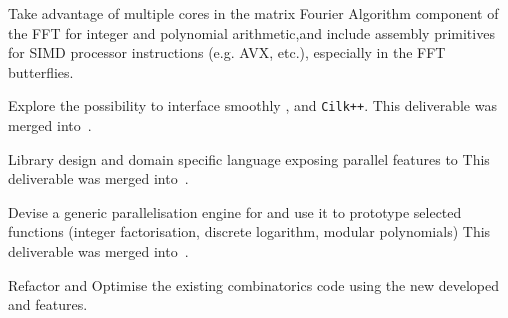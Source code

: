 \begin{workpackage}
\begin{wpdelivs}
\begin{wpdeliv}[due=18,miles=proto1,id=FFT,dissem=PU,nature=DEM, lead=UK,issue=120, status=delivered, blog=https://wbhart.blogspot.fr/2017/02/parallelising-integer-and-polynomial.html]
    {Take advantage of multiple cores in the matrix Fourier Algorithm component of the FFT for integer and polynomial arithmetic,and include assembly primitives for SIMD processor instructions (e.g. AVX, etc.), especially in the FFT butterflies.}
\end{wpdeliv}
  \begin{wpdeliv}[due=24,miles=proto1,id=cython-pythran-cilk,dissem=PU,nature=DEM,lead=PS,issue=121,status=canceled]
    {Explore the possibility to interface smoothly \Pythran, \Cython and \texttt{Cilk++}.}
    This deliverable was merged into~.
  \end{wpdeliv}
  \begin{wpdeliv}[due=24,miles=proto1,id=LinBox-DSL,dissem=PU,nature=R,lead=UJF,issue=122,status=canceled]
    {Library design and domain specific language exposing \Linbox parallel features to \Sage}
    This deliverable was merged into~.
  \end{wpdeliv}
  \begin{wpdeliv}[due=24,id=pari-hpc1,dissem=PU,nature=DEM,lead=UB,issue=108,status=canceled]
    {Devise a generic parallelisation engine for \Pari and use it to prototype selected functions
      (integer factorisation, discrete logarithm, modular polynomials)}
    This deliverable was merged into~.
  \end{wpdeliv}
  \begin{wpdeliv}[due=36,miles=hpc-prototype,id=sage-HPCcombi,dissem=PU,nature=DEM,lead=UB,issue=109,status=delivered]
      {Refactor and Optimise the existing combinatorics \Sage code using the new developed \Pythran and \Cython features.}
  \end{wpdeliv}

\end{wpdelivs}
\end{workpackage}
